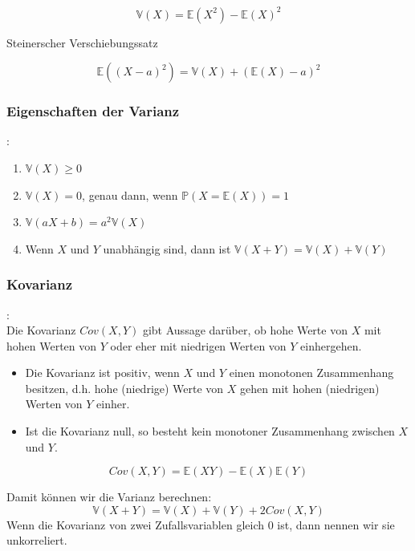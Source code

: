 {    \[\mathbb V\left(X\right)=\mathbb E\left(X^{2}\right)-\mathbb E\left(X\right)^{2}\]

    \begin{satz} Steinerscher Verschiebungssatz
        \label{satz:steinerscher_verschiebungssatz}

    \[
    \mathbb E\left(\left(X-a\right)^{2}\right)=\mathbb V\left(X\right)+\left(\mathbb E\left(X\right)-a\right)^{2}
    \]
    \end{satz}

    \subsubsection{Eigenschaften der Varianz}
    \begin{definition}:\label{def:varianz_eigenschaften}
    \begin{enumerate}[1)]
        \item $\mathbb V\left(X\right)\ge 0$
        \item $\mathbb V\left(X\right)=0$, genau dann, wenn $\mathbb P\left(X=\mathbb E\left(X\right)\right)=1$
        \item $\mathbb V\left(aX+b\right)=a^{2}\mathbb V\left(X\right)$
        \item Wenn $X$ und $Y$ unabhängig sind, dann ist $\mathbb V\left(X+Y\right)=\mathbb V\left(X\right)+\mathbb V(Y)$
    \end{enumerate}
    \end{definition}

    \subsubsection{Kovarianz}
    \begin{definition}[Kovarianz]:\\
    Die Kovarianz $Cov\left(X,Y\right)$ gibt Aussage darüber, ob hohe Werte
    von $X$ mit hohen Werten von $Y$ oder eher mit niedrigen Werten von $Y$
    einhergehen.

    \begin{itemize}
        \item Die Kovarianz ist positiv, wenn $X$ und $Y$ einen monotonen Zusammenhang
        besitzen, d.h. hohe (niedrige) Werte von $X$ gehen mit hohen (niedrigen)
        Werten von $Y$ einher.
        \item Ist die Kovarianz null, so besteht kein monotoner Zusammenhang zwischen $X$ und $Y$.
    \end{itemize}
    \[Cov\left(X,Y\right)=\mathbb E\left(XY\right)-\mathbb E\left(X\right)\mathbb E\left(Y\right)\]
    \end{definition}
    Damit können wir die Varianz berechnen:
    \[\mathbb V\left(X+Y\right)=\mathbb V\left(X\right)+\mathbb V\left(Y\right)+2Cov\left(X,Y\right)\]
    Wenn die Kovarianz von zwei Zufallsvariablen gleich 0 ist, dann nennen wir sie unkorreliert.

}
